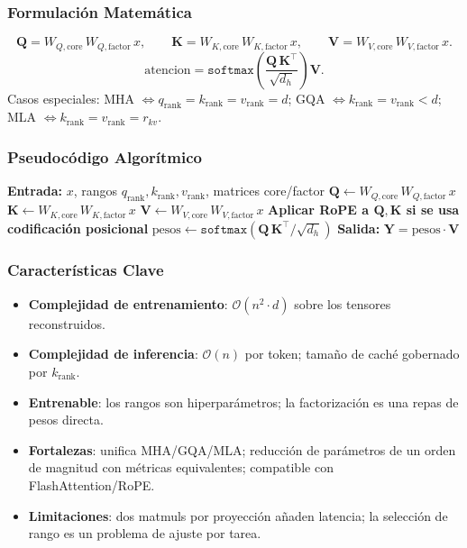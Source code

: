 \subsubsection{Formulación Matemática}
\[
\mathbf{Q} = W_{Q,\text{core}}\, W_{Q,\text{factor}}\, x, \qquad
\mathbf{K} = W_{K,\text{core}}\, W_{K,\text{factor}}\, x, \qquad
\mathbf{V} = W_{V,\text{core}}\, W_{V,\text{factor}}\, x.
\]
\[
\text{atencion} = \texttt{softmax}\!\left(\frac{\mathbf{Q}\, \mathbf{K}^\top}{\sqrt{d_h}}\right) \mathbf{V}.
\]
Casos especiales: MHA $\Leftrightarrow q_{\text{rank}} = k_{\text{rank}} = v_{\text{rank}} = d$; GQA $\Leftrightarrow k_{\text{rank}} = v_{\text{rank}} < d$; MLA $\Leftrightarrow k_{\text{rank}} = v_{\text{rank}} = r_{kv}$.

\subsubsection{Pseudocódigo Algorítmico}
\begin{algorithmic}[1]
\State \textbf{Entrada:} $x$, rangos $q_{\text{rank}}, k_{\text{rank}}, v_{\text{rank}}$, matrices core/factor
\State $\mathbf{Q} \gets W_{Q,\text{core}}\, W_{Q,\text{factor}}\, x$ 
\State $\mathbf{K} \gets W_{K,\text{core}}\, W_{K,\text{factor}}\, x$ 
\State $\mathbf{V} \gets W_{V,\text{core}}\, W_{V,\text{factor}}\, x$ 
\State \textbf{Aplicar RoPE a $\mathbf{Q}, \mathbf{K}$ si se usa codificación posicional}
\State $\text{pesos} \gets \texttt{softmax}(\mathbf{Q}\, \mathbf{K}^\top / \sqrt{d_h})$ 
\State \textbf{Salida:} $\mathbf{Y} = \text{pesos} \cdot \mathbf{V}$
\end{algorithmic}

\subsubsection{Características Clave}
\begin{itemize}[leftmargin=*]
    \item \textbf{Complejidad de entrenamiento}: $\mathcal{O}(n^2 \cdot d)$ sobre los tensores reconstruidos.
    \item \textbf{Complejidad de inferencia}: $\mathcal{O}(n)$ por token; tamaño de caché gobernado por $k_{\text{rank}}$.
    \item \textbf{Entrenable}: los rangos son hiperparámetros; la factorización es una repas de pesos directa.
    \item \textbf{Fortalezas}: unifica MHA/GQA/MLA; reducción de parámetros de un orden de magnitud con métricas equivalentes; compatible con FlashAttention/RoPE.
    \item \textbf{Limitaciones}: dos matmuls por proyección añaden latencia; la selección de rango es un problema de ajuste por tarea.
\end{itemize}

